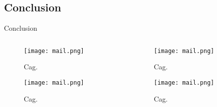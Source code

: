 \subsection{Conclusion}
\begin{frame}{Conclusion}

	\begin{columns}
		\begin{column}{0.5\textwidth}
			\begin{figure}
				\texttt{[image: mail.png]}
				\caption{\label{fig:g0}Cag.}
			\end{figure}
			\begin{figure}
				\texttt{[image: mail.png]}
				\caption{\label{fig:g1}Cag.}
			\end{figure}
		\end{column}
		\begin{column}{0.5\textwidth}
			\begin{figure}
				\texttt{[image: mail.png]}
				\caption{\label{fig:g2}Cag.}
			\end{figure}
			
			\begin{figure}
				\texttt{[image: mail.png]}
				\caption{\label{fig:g3}Cag.}
			\end{figure}
		\end{column}
	\end{columns}

\end{frame}

